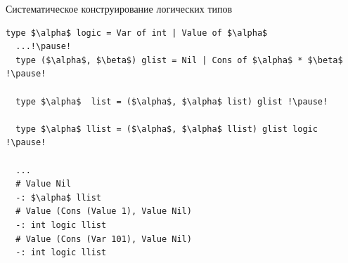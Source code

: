 \documentclass[10pt, mathserif]{beamer}
\theoremstyle{definition}
\begin{document}
\begin{frame}[fragile]{Систематическое конструирование логических типов}
  \begin{lstlisting}[mathescape=true]
  type $\alpha$ logic = Var of int | Value of $\alpha$
  ...!\pause!
  type ($\alpha$, $\beta$) glist = Nil | Cons of $\alpha$ * $\beta$ !\pause!

  type $\alpha$  list = ($\alpha$, $\alpha$ list) glist !\pause!

  type $\alpha$ llist = ($\alpha$, $\alpha$ llist) glist logic !\pause!

  ...
  # Value Nil
  -: $\alpha$ llist
  # Value (Cons (Value 1), Value Nil)
  -: int logic llist
  # Value (Cons (Var 101), Value Nil)
  -: int logic llist
  \end{lstlisting}
\end{frame}
%
%
%
%
\end{document}
